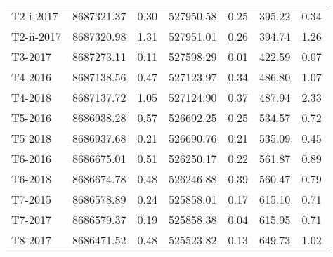 \begin{tabular}{lrrrrrr}
   T2-i-2017 &    8687321.37 &                0.30 &    527950.58 &               0.25 &         395.22 &                 0.34 \\
  T2-ii-2017 &    8687320.98 &                1.31 &    527951.01 &               0.26 &         394.74 &                 1.26 \\
     T3-2017 &    8687273.11 &                0.11 &    527598.29 &               0.01 &         422.59 &                 0.07 \\
     T4-2016 &    8687138.56 &                0.47 &    527123.97 &               0.34 &         486.80 &                 1.07 \\
     T4-2018 &    8687137.72 &                1.05 &    527124.90 &               0.37 &         487.94 &                 2.33 \\
     T5-2016 &    8686938.28 &                0.57 &    526692.25 &               0.25 &         534.57 &                 0.72 \\
     T5-2018 &    8686937.68 &                0.21 &    526690.76 &               0.21 &         535.09 &                 0.45 \\
     T6-2016 &    8686675.01 &                0.51 &    526250.17 &               0.22 &         561.87 &                 0.89 \\
     T6-2018 &    8686674.78 &                0.48 &    526246.88 &               0.39 &         560.47 &                 0.79 \\
     T7-2015 &    8686578.89 &                0.24 &    525858.01 &               0.17 &         615.10 &                 0.71 \\
     T7-2017 &    8686579.37 &                0.19 &    525858.38 &               0.04 &         615.95 &                 0.71 \\
     T8-2017 &    8686471.52 &                0.48 &    525523.82 &               0.13 &         649.73 &                 1.02 \\
\bottomrule
\end{tabular}
